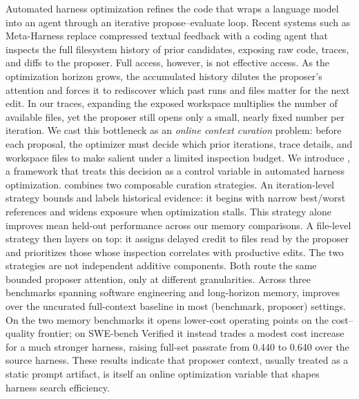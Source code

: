 Automated harness optimization refines the code that wraps a language model
into an agent through an iterative propose--evaluate loop. Recent systems such
as Meta-Harness replace compressed textual feedback with a coding agent that
inspects the full filesystem history of prior candidates, exposing raw code,
traces, and diffs to the proposer. Full access, however, is not effective
access. As the optimization horizon grows, the accumulated history dilutes
the proposer's attention and forces it to rediscover which past runs and
files matter for the next edit. In our traces, expanding the exposed
workspace multiplies the number of available files, yet the proposer still
opens only a small, nearly fixed number per iteration. We cast this
bottleneck as an \emph{online context curation} problem: before each
proposal, the optimizer must decide which prior iterations, trace details,
and workspace files to make salient under a limited inspection budget. We
introduce \name, a framework that treats this decision as a control variable
in automated harness optimization. \name combines two composable curation
strategies. An iteration-level strategy bounds and labels historical
evidence: it begins with narrow best/worst references and widens exposure
when optimization stalls. This strategy alone improves mean held-out
performance across our memory comparisons. A file-level strategy then layers
on top: it assigns delayed credit to files read by the proposer and
prioritizes those whose inspection correlates with productive edits. The two strategies are
not independent additive components. Both route the same bounded proposer
attention, only at different granularities. Across three benchmarks spanning
software engineering and long-horizon memory, \name improves over the
uncurated full-context baseline in most (benchmark, proposer) settings. On
the two memory benchmarks it opens lower-cost operating points on the
cost--quality frontier; on SWE-bench Verified it instead trades a modest
cost increase for a much stronger harness, raising full-set passrate from
0.440 to 0.640 over the source harness. These results indicate that
proposer context, usually treated as a static prompt artifact, is itself an
online optimization variable that shapes harness search efficiency.
